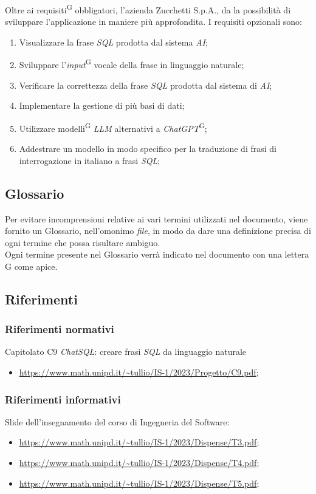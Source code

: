 \documentclass[5pt]{article}
\begin{document}
Oltre ai requisiti\textsuperscript{G} obbligatori, l'azienda Zucchetti S.p.A., da la possibilità di sviluppare l'applicazione in maniere più approfondita. I requisiti opzionali sono:
\begin{enumerate}
    \item Visualizzare la frase \textit{SQL} prodotta dal sistema \textit{AI};
    \item Sviluppare l'\textit{input}\textsuperscript{G} vocale della frase in linguaggio naturale;
    \item Verificare la correttezza della frase \textit{SQL} prodotta dal sistema di \textit{AI};
    \item Implementare la gestione di più basi di dati;
    \item Utilizzare modelli\textsuperscript{G} \textit{LLM} alternativi a \textit{ChatGPT}\textsuperscript{G};
    \item Addestrare un modello in modo specifico per la traduzione di frasi di interrogazione in italiano a frasi \textit{SQL};
\end{enumerate}

\subsection{Glossario}
Per evitare incomprensioni relative ai vari termini utilizzati nel documento, viene fornito un Glossario, nell'omonimo \textit{file}, in modo da dare una definizione precisa di ogni termine che possa risultare ambiguo.\\ Ogni termine presente nel Glossario verrà indicato nel documento con una lettera G come apice.

\subsection{Riferimenti}
\subsubsection{Riferimenti normativi}
Capitolato C9 \textit{ChatSQL}: creare frasi \textit{SQL} da linguaggio naturale
\begin{itemize}
    \item \url{https://www.math.unipd.it/~tullio/IS-1/2023/Progetto/C9.pdf};
\end{itemize}

\subsubsection{Riferimenti informativi}
Slide dell’insegnamento del corso di Ingegneria del Software:
\begin{itemize}
\item \url{https://www.math.unipd.it/~tullio/IS-1/2023/Dispense/T3.pdf};
\item \url{https://www.math.unipd.it/~tullio/IS-1/2023/Dispense/T4.pdf};
\item \url{https://www.math.unipd.it/~tullio/IS-1/2023/Dispense/T5.pdf};
\end{itemize}
\end{document}
